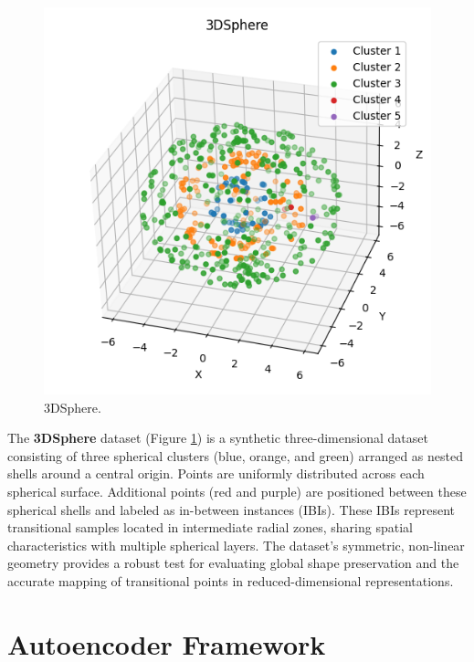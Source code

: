 \begin{figure}
    \centering
    \includegraphics[width=\myimgwidth]{images/datasets/3DSphere.png}
    \caption{3DSphere.}
    \label{fig:3DSphere}
\end{figure}
The \textbf{3DSphere} dataset (Figure \ref{fig:3DSphere}) is a synthetic three-dimensional dataset consisting of three spherical clusters (blue, orange, and green) arranged as nested shells around a central origin. Points are uniformly distributed across each spherical surface. Additional points (red and purple) are positioned between these spherical shells and labeled as in-between instances (IBIs). These IBIs represent transitional samples located in intermediate radial zones, sharing spatial characteristics with multiple spherical layers. The dataset’s symmetric, non-linear geometry provides a robust test for evaluating global shape preservation and the accurate mapping of transitional points in reduced-dimensional representations.

\section{Autoencoder Framework} \label{sec:autoencoder_framework}

